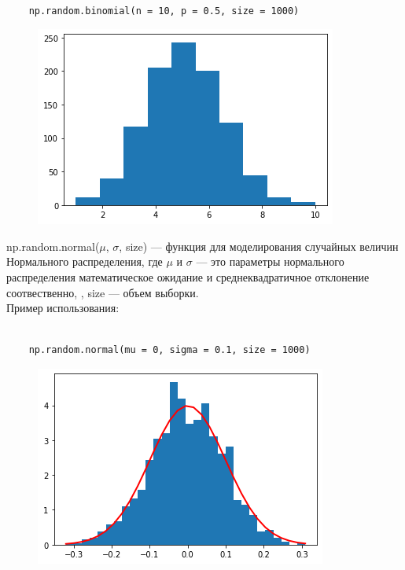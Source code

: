 \documentclass[a4paper]{article}
\begin{document}
\begin{verbatim}

    np.random.binomial(n = 10, p = 0.5, size = 1000)

\end{verbatim}
\begin{figure}[h!]
    \centering
    \includegraphics[scale=0.5]{example.png}
 
\end{figure}


np.random.normal($\mu$, $\sigma$, size) --- функция для моделирования случайных величин Нормального распределения, где $\mu$ и $\sigma$ --- это параметры нормального распределения математическое ожидание и среднеквадратичное отклонение соотвественно, , size --- объем выборки.\\
Пример использования:
\begin{verbatim}

    np.random.normal(mu = 0, sigma = 0.1, size = 1000)

\end{verbatim}

\begin{figure}[h!]
    \centering
    \includegraphics[scale=0.5]{example2.png}
 
\end{figure}



\end{document}
